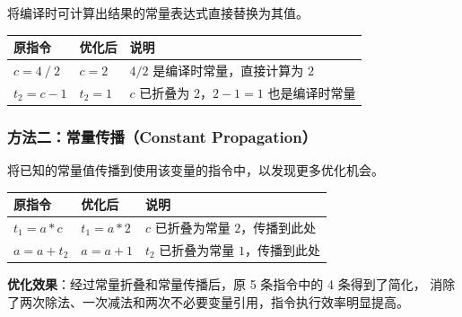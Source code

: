 \documentclass[12pt]{article}
\begin{document}
将编译时可计算出结果的常量表达式直接替换为其值。

\begin{center}
\begin{tabular}{lll}
\toprule
\textbf{原指令} & \textbf{优化后} & \textbf{说明} \\
\midrule
$c = 4\ /\ 2$   & $c = 2$   & $4/2$ 是编译时常量，直接计算为 $2$ \\
$t_2 = c - 1$   & $t_2 = 1$ & $c$ 已折叠为 $2$，$2-1=1$ 也是编译时常量 \\
\bottomrule
\end{tabular}
\end{center}

\subsubsection*{方法二：常量传播（Constant Propagation）}

将已知的常量值传播到使用该变量的指令中，以发现更多优化机会。

\begin{center}
\begin{tabular}{lll}
\toprule
\textbf{原指令} & \textbf{优化后} & \textbf{说明} \\
\midrule
$t_1 = a * c$   & $t_1 = a * 2$ & $c$ 已折叠为常量 $2$，传播到此处 \\
$a = a + t_2$   & $a = a + 1$   & $t_2$ 已折叠为常量 $1$，传播到此处 \\
\bottomrule
\end{tabular}
\end{center}

\textbf{优化效果}：经过常量折叠和常量传播后，原 5 条指令中的 4 条得到了简化，
消除了两次除法、一次减法和两次不必要变量引用，指令执行效率明显提高。
\end{document}
